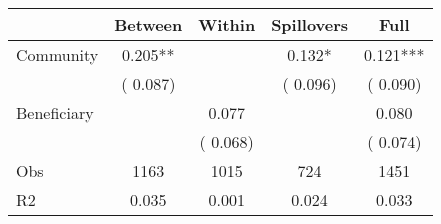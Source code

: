 
\begin{tabular}{l*{4}{c}}\hline&\multicolumn{1}{c}{Between}&\multicolumn{1}{c}{Within}&\multicolumn{1}{c}{Spillovers}&\multicolumn{1}{c}{Full}\\ \hline
 Community             &              0.205**      &                                               &        0.132* &         0.121***                            \\ 
                               &        (       0.087)           &                                       &       (       0.096)     &      (       0.090)                                           \\ 
 Beneficiary   &                                               &        0.077    &                                &             0.080                            \\ 
                               &                                               & (       0.068)                  &                                        &      (       0.074)                                           \\ 
\hline                                                                                                                                                                                                                                            
 Obs                   &               1163               &       1015                       &       724                &              1451                                               \\ 
 R2                    &                      0.035              &              0.001                      &              0.024               &                     0.033                                              \\ 
\hline \end{tabular}                                                                                                                                                                                                              